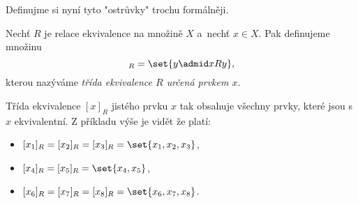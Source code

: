 Definujme si nyní tyto "ostrůvky" trochu formálněji.
\begin{definition}
    Nechť $R$ je relace ekvivalence na množině $X$ a~nechť $x\in X$. Pak definujeme množinu
    \begin{equation*}
        [x]_R=\set{y \admid xRy},
    \end{equation*}
    kterou nazýváme \emph{třída ekvivalence $R$ určená prvkem $x$}.
\end{definition}
Třída ekvivalence $[x]_R$ jistého prvku $x$ tak obsahuje všechny prvky, které jsou s $x$ ekvivalentní. Z příkladu výše je vidět že platí:
\begin{itemize}
    \item $[x_1]_R=[x_2]_R=[x_3]_R=\set{x_1,x_2,x_3}$,
    \item $[x_4]_R=[x_5]_R=\set{x_4,x_5}$,
    \item $[x_6]_R=[x_7]_R=[x_8]_R=\set{x_6,x_7,x_8}$.
\end{itemize}
